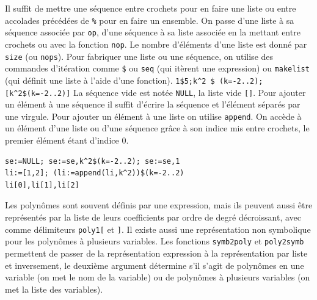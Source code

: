 \documentclass{article}
\begin{document}
\begin{giacjshere}
Il suffit de mettre une s\'equence entre crochets pour en faire une liste
ou entre accolades pr\'ec\'ed\'ees de \verb|%| pour en faire un ensemble.
On passe d'une liste \`a sa s\'equence associ\'ee par \verb|op|, 
d'une s\'equence \`a sa liste associ\'ee en la mettant entre crochets
ou avec la fonction \verb|nop|.
Le nombre d'\'el\'ements d'une liste est donn\'e par \verb|size| 
(ou \verb|nops|).
Pour fabriquer une liste ou une s\'equence, on utilise des commandes
d'it\'eration comme \verb|$| %
ou \verb|seq| (qui it\`erent une
expression) ou \verb|makelist| (qui d\'efinit une liste \`a l'aide d'une 
fonction).  
\verb|1$5;k^2 $ (k=-2..2);[k^2$(k=-2..2)]|
La s\'equence vide est not\'ee \verb|NULL|, la liste vide
\verb|[]|. Pour ajouter un \'el\'ement \`a une s\'equence il suffit
d'\'ecrire la s\'equence et l'\'el\'ement s\'epar\'es par une virgule. 
Pour ajouter un
\'el\'ement \`a une liste on utilise \verb|append|.
On acc\`ede \`a un \'el\'ement d'une liste ou d'une s\'equence gr\^ace 
\`a son indice mis entre 
crochets, le premier \'el\'ement \'etant d'indice 0.
\begin{verbatim}
se:=NULL; se:=se,k^2$(k=-2..2); se:=se,1
li:=[1,2]; (li:=append(li,k^2))$(k=-2..2)
li[0],li[1],li[2]
\end{verbatim}

Les polyn\^omes sont souvent d\'efinis par une expression, mais
ils peuvent aussi \^etre repr\'esent\'es 
par la liste de leurs coefficients par ordre
de degr\'e d\'ecroissant, avec comme d\'elimiteurs \verb|poly1[| et \verb|]|.
Il existe aussi une repr\'esentation non symbolique
pour les polyn\^omes \`a plusieurs variables. Les fonctions
\verb|symb2poly| et \verb|poly2symb| permettent
de passer de la repr\'esentation expression \`a la repr\'esentation
par liste et inversement, 
le deuxi\`eme argument d\'etermine s'il s'agit de polyn\^omes
en une variable (on met le nom de la variable) ou de
polyn\^omes \`a plusieurs variables (on met la liste des variables).


\end{giacjshere}
\end{document}

